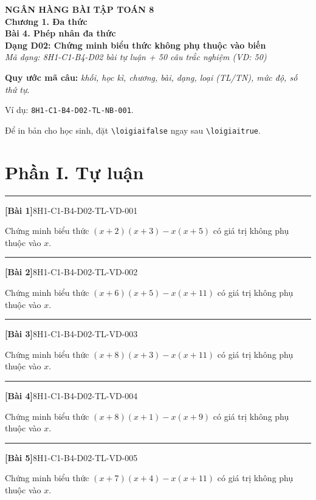 \documentclass[12pt,a4paper]{article}
\newif\ifloigiai
\newenvironment{cauhoi}[2]{%
  \par\medskip\noindent\rule{\textwidth}{0.4pt}\par\nopagebreak
  \noindent\textbf{[#1]}\hfill{\scriptsize\ttfamily #2}\par\nopagebreak\smallskip}{\par}
\newcommand{\loigiai}[1]{\ifloigiai\par\smallskip\noindent\textit{Lời giải.} #1\par\fi}
\begin{document}
\begin{center}
{\Large\textbf{NGÂN HÀNG BÀI TẬP TOÁN 8}}\\[3pt]
\textbf{Chương 1. Đa thức}\\[2pt]
\textbf{Bài 4. Phép nhân đa thức}\\[2pt]
\textbf{Dạng D02: Chứng minh biểu thức không phụ thuộc vào biến}\\[2pt]
\textit{Mã dạng: 8H1-C1-B4-D02  bài tự luận + 50 câu trắc nghiệm \quad (VD: 50)}
\end{center}
\textbf{Quy ước mã câu:} \textit{khối, học kì, chương, bài, dạng, loại (TL/TN), mức độ, số thứ tự}.\par Ví dụ: \texttt{8H1-C1-B4-D02-TL-NB-001}.\par Để in bản cho học sinh, đặt \verb|\loigiaifalse| ngay sau \verb|\loigiaitrue|.
\section*{Phần I. Tự luận}
\begin{cauhoi}{Bài 1}{8H1-C1-B4-D02-TL-VD-001}
Chứng minh biểu thức $(x+2)(x+3)-x(x+5)$ có giá trị không phụ thuộc vào $x$.
\loigiai{$(x+2)(x+3)-x(x+5)=x^{2}+2x+3x+6-x^{2}-5x=6$. Kết quả là hằng số nên biểu thức không phụ thuộc vào $x$.}
\end{cauhoi}
\begin{cauhoi}{Bài 2}{8H1-C1-B4-D02-TL-VD-002}
Chứng minh biểu thức $(x+6)(x+5)-x(x+11)$ có giá trị không phụ thuộc vào $x$.
\loigiai{$(x+6)(x+5)-x(x+11)=x^{2}+6x+5x+30-x^{2}-11x=30$. Kết quả là hằng số nên biểu thức không phụ thuộc vào $x$.}
\end{cauhoi}
\begin{cauhoi}{Bài 3}{8H1-C1-B4-D02-TL-VD-003}
Chứng minh biểu thức $(x+8)(x+3)-x(x+11)$ có giá trị không phụ thuộc vào $x$.
\loigiai{$(x+8)(x+3)-x(x+11)=x^{2}+8x+3x+24-x^{2}-11x=24$. Kết quả là hằng số nên biểu thức không phụ thuộc vào $x$.}
\end{cauhoi}
\begin{cauhoi}{Bài 4}{8H1-C1-B4-D02-TL-VD-004}
Chứng minh biểu thức $(x+8)(x+1)-x(x+9)$ có giá trị không phụ thuộc vào $x$.
\loigiai{$(x+8)(x+1)-x(x+9)=x^{2}+8x+x+8-x^{2}-9x=8$. Kết quả là hằng số nên biểu thức không phụ thuộc vào $x$.}
\end{cauhoi}
\begin{cauhoi}{Bài 5}{8H1-C1-B4-D02-TL-VD-005}
Chứng minh biểu thức $(x+7)(x+4)-x(x+11)$ có giá trị không phụ thuộc vào $x$.
\loigiai{$(x+7)(x+4)-x(x+11)=x^{2}+7x+4x+28-x^{2}-11x=28$. Kết quả là hằng số nên biểu thức không phụ thuộc vào $x$.}
\end{cauhoi}
\end{document}
